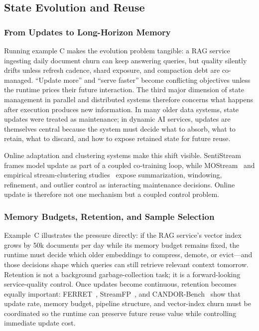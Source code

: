 ﻿\documentclass[manuscript]{acmart}
\newcommand{\sysproblem}{state management in parallel and distributed systems\xspace}
\begin{document}
\subsection{State Evolution and Reuse}

\subsubsection{From Updates to Long-Horizon Memory}

Running example C makes the evolution problem tangible: a RAG service ingesting daily document churn can keep answering queries, but quality silently drifts unless refresh cadence, shard exposure, and compaction debt are co-managed. ``Update more'' and ``serve faster'' become conflicting objectives unless the runtime prices their future interaction. The third major dimension of \sysproblem therefore concerns what happens after execution produces new information. In many older data systems, state updates were treated as maintenance; in dynamic AI services, updates are themselves central because the system must decide what to absorb, what to retain, what to discard, and how to expose retained state for future reuse.

Online adaptation and clustering systems make this shift visible. SentiStream~\cite{wu2023sentistream} frames model update as part of a coupled co-training loop, while MOStream~\cite{wang2024mostream} and empirical stream-clustering studies~\cite{wang2023dscstudy} expose summarization, windowing, refinement, and outlier control as interacting maintenance decisions. Online update is therefore not one mechanism but a coupled control problem.

\subsubsection{Memory Budgets, Retention, and Sample Selection}

Example~C illustrates the pressure directly: if the RAG service's vector index grows by 50k documents per day while its memory budget remains fixed, the runtime must decide which older embeddings to compress, demote, or evict---and those decisions shape which queries can still retrieve relevant context tomorrow. Retention is not a background garbage-collection task; it is a forward-looking service-quality control. Once updates become continuous, retention becomes equally important: FERRET~\cite{zhou2025ferret}, StreamFP~\cite{li2026streamfp}, and CANDOR-Bench~\cite{wang2026candor} show that update rate, memory budget, pipeline structure, and vector-index churn must be coordinated so the runtime can preserve future reuse value while controlling immediate update cost.
\end{document}
